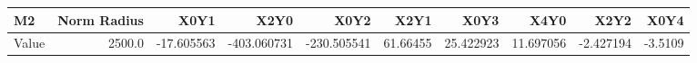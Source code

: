 \documentclass[convert={convertexe={magick.exe}, density={150}}]{standalone}
\begin{document}
\begin{tabular}{lrrrrrrrrr}
\toprule
\bf{M2} &  Norm Radius &       X0Y1 &        X2Y0 &        X0Y2 &      X2Y1 &       X0Y3 &       X4Y0 &      X2Y2 &    X0Y4 \\
\midrule
Value &       2500.0 & -17.605563 & -403.060731 & -230.505541 &  61.66455 &  25.422923 &  11.697056 & -2.427194 & -3.5109 \\
\bottomrule
\end{tabular}
\end{document}
